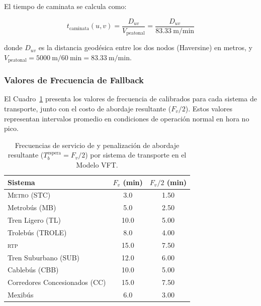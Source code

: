 El tiempo de caminata se calcula como:

\begin{equation}
    t_{\text{caminata}}(u, v) = \frac{D_{uv}}{V_{\text{peatonal}}}
    = \frac{D_{uv}}{83.33\ \text{m/min}}
    \label{eq:t-caminata}
\end{equation}

donde $D_{uv}$ es la distancia geodésica entre los dos nodos (Haversine) en
metros, y $V_{\text{peatonal}} = 5000\ \text{m} / 60\ \text{min} = 83.33\ \text{m/min}$.

\subsubsection{Valores de Frecuencia de Fallback}
\label{subsubsec:fallback-frecuencia}

El Cuadro~\ref{tab:fallback-frecuencia} presenta los valores de frecuencia de
 calibrados para cada sistema de transporte, junto con el
costo de abordaje resultante ($F_v / 2$). Estos valores representan intervalos
promedio en condiciones de operación normal en hora no pico.

\begin{table}[H]
    \centering
    \caption[Frecuencias de \textit{fallback} y costo de abordaje por sistema]{Frecuencias
    de servicio de  y penalización de abordaje resultante
    ($T_b^{\text{espera}} = F_v / 2$) por sistema de transporte en el Modelo VFT.}
    \label{tab:fallback-frecuencia}
    \begin{tabular}{|l|c|c|}
        \hline
        \textbf{Sistema} & \textbf{$F_v$ (min)} & \textbf{$F_v / 2$ (min)} \\
        \hline
        \textsc{Metro} (STC)          & 3.0  & 1.50 \\
        Metrobús (MB)                 & 5.0  & 2.50 \\
        Tren Ligero (TL)              & 10.0 & 5.00 \\
        Trolebús (TROLE)              & 8.0  & 4.00 \\
        \textsc{rtp}                  & 15.0 & 7.50 \\
        Tren Suburbano (SUB)          & 12.0 & 6.00 \\
        Cablebús (CBB)                & 10.0 & 5.00 \\
        Corredores Concesionados (CC) & 15.0 & 7.50 \\
        Mexibús                       & 6.0  & 3.00 \\
        \hline
    \end{tabular}
\end{table}

